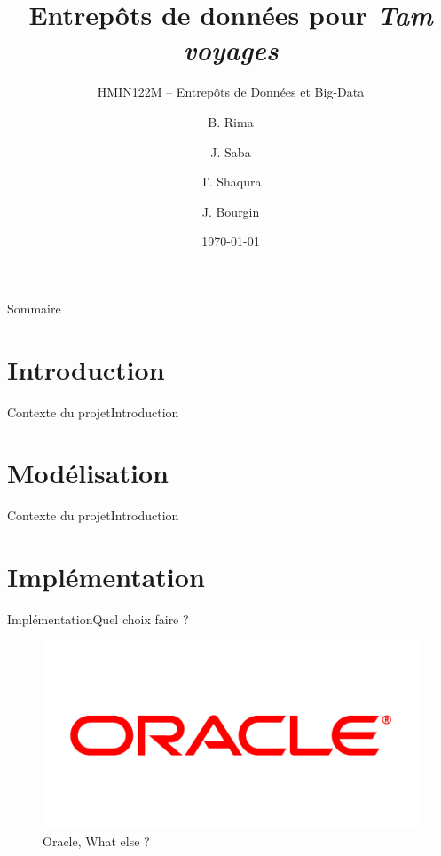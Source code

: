 \documentclass[usenames,dvipsnames]{beamer}
\title{Entrepôts de données pour \textit{Tam voyages}}
\subtitle{HMIN122M -- Entrepôts de Données et Big-Data}
\author{B. Rima \and J. Saba \and T. Shaqura \and J. Bourgin}
\institute[UM]{M1 Informatique AIGLE}
\date{\today}
\begin{document}
\begin{frame}
\titlepage
\end{frame}
\begin{frame}{Sommaire}
\tableofcontents
\end{frame}
\section{Introduction}
\begin{frame}{Contexte du projet}{Introduction}
\end{frame}

\section{Modélisation}
\begin{frame}{Contexte du projet}{Introduction}
\end{frame}

\section{Implémentation}
\begin{frame}{Implémentation}{Quel choix faire ?}
\begin{figure}[!ht]
  \centering
  \includegraphics[scale=0.5]{images/Oracle.png}
  \caption{Oracle, What else ?}
\end{figure}
\end{frame}
\end{document}
